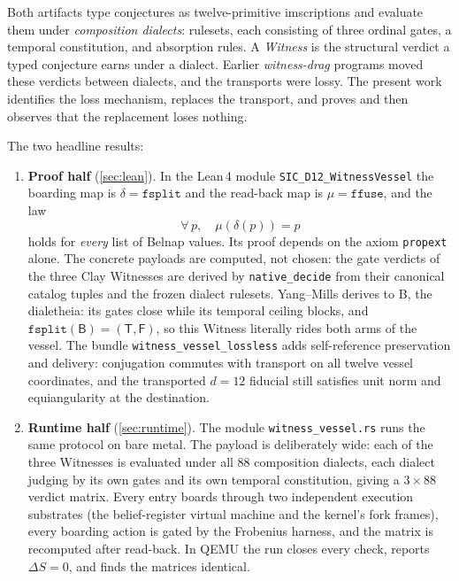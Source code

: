 \documentclass[12pt,a4paper]{article}
\newcommand{\Lean}{\textsf{Lean}\,4}
\newcommand{\bT}{\textsf{T}}
\newcommand{\bF}{\textsf{F}}
\newcommand{\bB}{\textsf{B}}
\begin{document}
Both artifacts type conjectures as twelve-primitive imscriptions and evaluate
them under \emph{composition dialects}: rulesets, each consisting of three
ordinal gates, a temporal constitution, and absorption rules. A
\emph{Witness} is the structural verdict a typed conjecture earns under a
dialect. Earlier \emph{witness-drag} programs moved these verdicts between
dialects, and the transports were lossy. The present work identifies the
loss mechanism, replaces the transport, and proves and then observes that
the replacement loses nothing.

The two headline results:

\begin{enumerate}
\item \textbf{Proof half} (\cref{sec:lean}). In the \Lean{} module
\texttt{SIC\_D12\_WitnessVessel} the boarding map is
$\delta = \texttt{fsplit}$ and the read-back map is
$\mu = \texttt{ffuse}$, and the law
\[
\forall\, p,\quad \mu(\delta(p)) = p
\]
holds for \emph{every} list of Belnap values. Its proof depends on the
axiom \texttt{propext} alone. The concrete payloads are computed, not
chosen: the gate verdicts of the three Clay Witnesses are derived by
\texttt{native\_decide} from their canonical catalog tuples and the
frozen dialect rulesets. Yang--Mills derives to \bB{}, the dialetheia:
its gates close while its temporal ceiling blocks, and
$\texttt{fsplit}(\bB) = (\bT, \bF)$, so this Witness literally rides both
arms of the vessel. The bundle \texttt{witness\_vessel\_lossless} adds
self-reference preservation and delivery: conjugation commutes with
transport on all twelve vessel coordinates, and the transported $d=12$
fiducial still satisfies unit norm and equiangularity at the destination.

\item \textbf{Runtime half} (\cref{sec:runtime}). The module
\texttt{witness\_vessel.rs} runs the same protocol on bare metal. The
payload is deliberately wide: each of the three Witnesses is evaluated
under all $88$ composition dialects, each dialect judging by its own
gates and its own temporal constitution, giving a $3 \times 88$ verdict
matrix. Every entry boards through two independent execution substrates
(the belief-register virtual machine and the kernel's fork frames), every
boarding action is gated by the Frobenius harness, and the matrix is
recomputed after read-back. In QEMU the run closes every check,
reports $\Delta S = 0$, and finds the matrices identical.
\end{enumerate}
\end{document}

